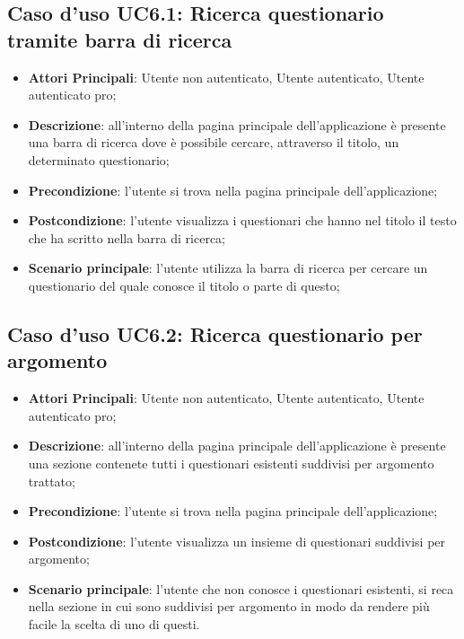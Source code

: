 \subsection{Caso d'uso UC6.1: Ricerca questionario tramite barra di ricerca}
\begin{itemize}
\item\textbf{Attori Principali}: Utente non autenticato, Utente autenticato, Utente autenticato pro;
\item\textbf{Descrizione}: all'interno della pagina principale dell'applicazione è presente una barra di ricerca dove è possibile cercare, attraverso il titolo, un determinato questionario;
\item\textbf{Precondizione}: l'utente si trova nella pagina principale dell'applicazione;
\item\textbf{Postcondizione}: l'utente visualizza i questionari che hanno nel titolo il testo che ha scritto nella barra di ricerca;
\item\textbf{Scenario principale}: l'utente utilizza la barra di ricerca per cercare un questionario del quale conosce il titolo o parte di questo;
\end{itemize}

\subsection{Caso d'uso UC6.2: Ricerca questionario per argomento}
\begin{itemize}
\item\textbf{Attori Principali}: Utente non autenticato, Utente autenticato, Utente autenticato pro;
\item\textbf{Descrizione}: all'interno della pagina principale dell'applicazione è presente una sezione contenete tutti i questionari esistenti suddivisi per argomento trattato;
\item\textbf{Precondizione}: l'utente si trova nella pagina principale dell'applicazione;
\item\textbf{Postcondizione}: l'utente visualizza un insieme di questionari suddivisi per argomento;
\item\textbf{Scenario principale}: l'utente che non conosce i questionari esistenti, si reca nella sezione in cui sono suddivisi per argomento in modo da rendere più facile la scelta di uno di questi. 
\end{itemize}

